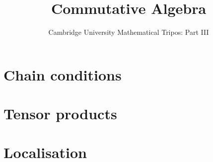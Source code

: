 \documentclass{article}
\title{Commutative Algebra}
\author{Cambridge University Mathematical Tripos: Part III}
\begin{document}
\maketitle

\tableofcontentsnewpage{}

\section{Chain conditions}

\section{Tensor products}

\section{Localisation}

\end{document}
